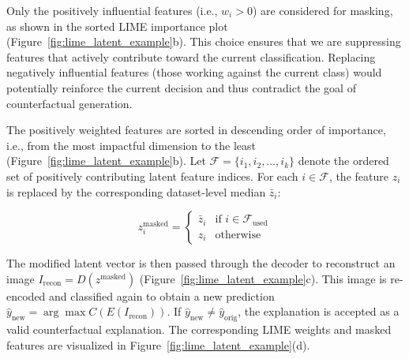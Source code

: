 Only the positively influential features (i.e., $w_i > 0$) are considered for masking, as shown in the sorted LIME importance plot (Figure~\ref{fig:lime_latent_example}b). This choice ensures that we are suppressing features that actively contribute toward the current classification. Replacing negatively influential features (those working against the current class) would potentially reinforce the current decision and thus contradict the goal of counterfactual generation.

The positively weighted features are sorted in descending order of importance, i.e., from the most impactful dimension to the least (Figure~\ref{fig:lime_latent_example}b). Let $\mathcal{F} = \{i_1, i_2, \dots, i_k\}$ denote the ordered set of positively contributing latent feature indices. For each $i \in \mathcal{F}$, the feature $z_i$ is replaced by the corresponding dataset-level median $\bar{z}_i$:


\[
z_i^{\text{masked}} = 
\begin{cases}
\bar{z}_i & \text{if } i \in \mathcal{F}_{\text{used}} \\
z_i & \text{otherwise}
\end{cases}
\]

The modified latent vector is then passed through the decoder to reconstruct an image $I_{\text{recon}} = D(z^{\text{masked}})$ (Figure~\ref{fig:lime_latent_example}c). This image is re-encoded and classified again to obtain a new prediction $\hat{y}_{\text{new}} = \arg\max C(E(I_{\text{recon}}))$. If $\hat{y}_{\text{new}} \ne \hat{y}_{\text{orig}}$, the explanation is accepted as a valid counterfactual explanation. The corresponding LIME weights and masked features are visualized in Figure~\ref{fig:lime_latent_example}(d).



